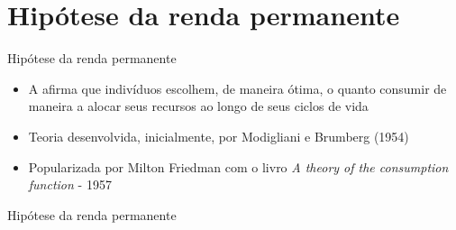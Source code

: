 \documentclass[10pt]{beamer}
\begin{document}
\section{Hipótese da renda permanente}
\begin{frame}
    {Hipótese da renda permanente}
    \begin{itemize}
        \item A  afirma que indivíduos escolhem, de maneira ótima, o quanto consumir de maneira a alocar seus recursos ao longo de seus ciclos de vida\bigskip
        \item Teoria desenvolvida, inicialmente, por Modigliani e Brumberg (1954)\bigskip
        \item Popularizada por Milton Friedman com o livro \emph{A theory of the consumption function} - 1957
    \end{itemize}
\end{frame}

\begin{frame}{Hipótese da renda permanente}
    \begin{figure}
        \centering
         \qquad
        \label{aula7_fig1pih}
    \end{figure}
\end{frame}
\end{document}

